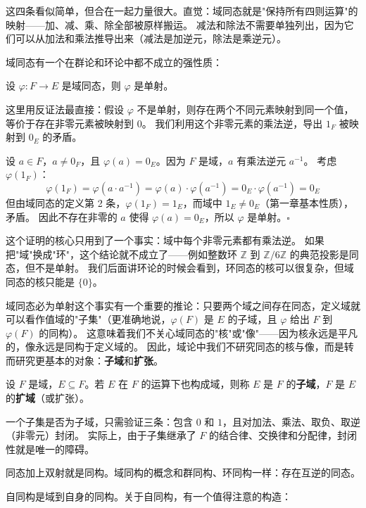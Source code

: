 这四条看似简单，但合在一起力量很大。直觉：域同态就是"保持所有四则运算"的映射——加、减、乘、除全部被原样搬运。
减法和除法不需要单独列出，因为它们可以从加法和乘法推导出来（减法是加逆元，除法是乘逆元）。

域同态有一个在群论和环论中都不成立的强性质：

\begin{theorem}[域同态必为单射]\label{thm:field-hom-injective}
设 $\varphi: F \to E$ 是域同态，则 $\varphi$ 是单射。
\end{theorem}

这里用反证法最直接：假设 $\varphi$ 不是单射，则存在两个不同元素映射到同一个值，等价于存在非零元素被映射到 $0$。
我们利用这个非零元素的乘法逆，导出 $1_F$ 被映射到 $0_E$ 的矛盾。

设 $a \in F$，$a \neq 0_F$，且 $\varphi(a) = 0_E$。因为 $F$ 是域，$a$ 有乘法逆元 $a^{-1}$。
考虑 $\varphi(1_F)$：
\[
\varphi(1_F) = \varphi(a \cdot a^{-1}) = \varphi(a) \cdot \varphi(a^{-1})
= 0_E \cdot \varphi(a^{-1}) = 0_E
\]
但由域同态的定义第 2 条，$\varphi(1_F) = 1_E$，而域中 $1_E \neq 0_E$（第一章基本性质），矛盾。
因此不存在非零的 $a$ 使得 $\varphi(a) = 0_E$，所以 $\varphi$ 是单射。$\square$

这个证明的核心只用到了一个事实：域中每个非零元素都有乘法逆。
如果把"域"换成"环"，这个结论就不成立了——例如整数环 $\mathbb{Z}$ 到 $\mathbb{Z}/6\mathbb{Z}$ 的典范投影是同态，但不是单射。
我们后面讲环论的时候会看到，环同态的核可以很复杂，但域同态的核只能是 $\{0\}$。

域同态必为单射这个事实有一个重要的推论：只要两个域之间存在同态，定义域就可以看作值域的"子集"（更准确地说，$\varphi(F)$ 是 $E$ 的子域，且 $\varphi$ 给出 $F$ 到 $\varphi(F)$ 的同构）。
这意味着我们不关心域同态的"核"或"像"——因为核永远是平凡的，像永远是同构于定义域的。
因此，域论中我们不研究同态的核与像，而是转而研究更基本的对象：\textbf{子域}和\textbf{扩张}。

\begin{definition}[子域]\label{def:subfield}
设 $F$ 是域，$E \subseteq F$。若 $E$ 在 $F$ 的运算下也构成域，则称 $E$ 是 $F$ 的\textbf{子域}，$F$ 是 $E$ 的\textbf{扩域}（或扩张）。
\end{definition}

一个子集是否为子域，只需验证三条：包含 $0$ 和 $1$，且对加法、乘法、取负、取逆（非零元）封闭。
实际上，由于子集继承了 $F$ 的结合律、交换律和分配律，封闭性就是唯一的障碍。

同态加上双射就是同构。域同构的概念和群同构、环同构一样：存在互逆的同态。

自同构是域到自身的同构。关于自同构，有一个值得注意的构造：

